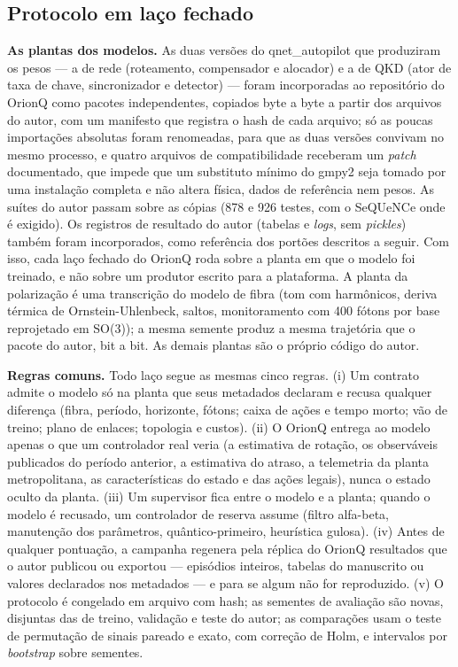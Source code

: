\documentclass[12pt]{article}
\begin{document}
\subsection{Protocolo em laço fechado}

\textbf{As plantas dos modelos.} As duas versões do qnet\_autopilot que
produziram os pesos --- a de rede (roteamento, compensador e alocador) e a de
QKD (ator de taxa de chave, sincronizador e detector) --- foram incorporadas ao
repositório do OrionQ como pacotes independentes, copiados byte a byte a partir
dos arquivos do autor, com um manifesto que registra o hash de cada arquivo;
só as poucas importações absolutas foram renomeadas, para que as duas versões
convivam no mesmo processo, e quatro arquivos de compatibilidade receberam um
\textit{patch} documentado, que impede que um substituto mínimo do gmpy2 seja
tomado por uma instalação completa e não altera física, dados de referência nem
pesos. As suítes do autor passam sobre as cópias (878 e 926
testes, com o SeQUeNCe onde é exigido). Os registros de resultado do autor
(tabelas e \textit{logs}, sem \textit{pickles}) também foram incorporados, como
referência dos portões descritos a seguir. Com isso, cada laço fechado do
OrionQ roda sobre a planta em que o modelo foi treinado, e não sobre um
produtor escrito para a plataforma. A planta da polarização é uma transcrição do
modelo de fibra (tom com harmônicos, deriva térmica de Ornstein-Uhlenbeck,
saltos, monitoramento com 400 fótons por base reprojetado em SO(3)); a mesma
semente produz a mesma trajetória que o pacote do autor, bit a bit. As demais
plantas são o próprio código do autor.

\textbf{Regras comuns.} Todo laço segue as mesmas cinco regras.
(i) Um contrato admite o modelo só na planta que seus metadados declaram e
recusa qualquer diferença (fibra, período, horizonte, fótons; caixa de ações e
tempo morto; vão de treino; plano de enlaces; topologia e custos).
(ii) O OrionQ entrega ao modelo apenas o que um controlador real veria (a
estimativa de rotação, os observáveis publicados do período anterior, a
estimativa do atraso, a telemetria da planta metropolitana, as características
do estado e das ações legais), nunca o estado oculto da planta.
(iii) Um supervisor fica entre o modelo e a planta; quando o modelo é recusado,
um controlador de reserva assume (filtro alfa-beta, manutenção dos parâmetros,
quântico-primeiro, heurística gulosa).
(iv) Antes de qualquer pontuação, a campanha regenera pela réplica do OrionQ
resultados que o autor publicou ou exportou --- episódios inteiros, tabelas do
manuscrito ou valores declarados nos metadados --- e para se algum não for
reproduzido.
(v) O protocolo é congelado em arquivo com hash; as sementes de avaliação são
novas, disjuntas das de treino, validação e teste do autor; as comparações usam
o teste de permutação de sinais pareado e exato, com correção de Holm, e
intervalos por \textit{bootstrap} sobre sementes.
\end{document}
